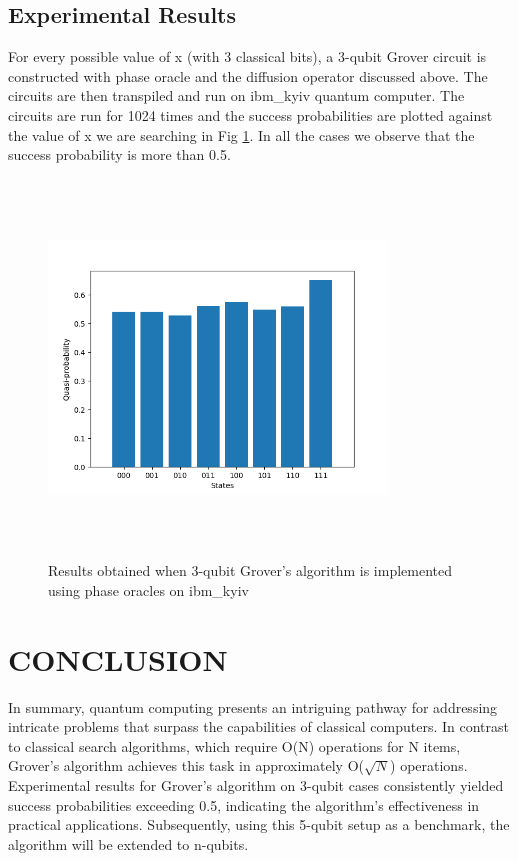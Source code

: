 \documentclass[conference]{IEEEtran}
\begin{document}
\subsection{Experimental Results}
For every possible value of x (with 3 classical bits), a 3-qubit Grover circuit is constructed with phase oracle and the diffusion operator discussed above. The circuits are then transpiled and run on ibm\_kyiv quantum computer.
The circuits are run for 1024 times and the success probabilities are plotted against the value of x we are searching in Fig \ref{fig:ibm_kyiv_results}. In all the cases we observe that the success probability is more than 0.5.
\begin{figure}[htbp]
	\centerline{\includegraphics[width=9cm,height=10cm,keepaspectratio]{ibm_kyiv_phase_oracles.png}}
	\caption{Results obtained when 3-qubit Grover's algorithm is implemented using phase oracles on ibm\_kyiv}
	\label{fig:ibm_kyiv_results}
\end{figure}

\section{CONCLUSION}
In summary, quantum computing presents an intriguing
pathway for addressing intricate problems that surpass the capabilities of classical computers. In contrast to classical
search algorithms, which require O(N) operations for N
items, Grover's algorithm achieves this task in approximately
O($\sqrt{N} $) operations. Experimental results for Grover's algorithm on 3-qubit cases consistently yielded success probabilities exceeding 0.5, indicating the algorithm's effectiveness in practical applications.
Subsequently,
using this 5-qubit setup as a benchmark, the algorithm will
be extended to n-qubits.
\end{document}
